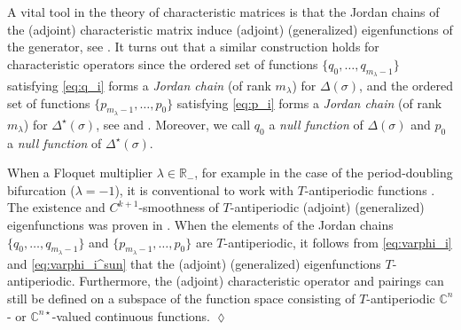\documentclass[english]{myarticle}
\begin{document}
\begin{sloppypar}
A vital tool in the theory of characteristic matrices is that the Jordan chains of the (adjoint) characteristic matrix induce (adjoint) (generalized) eigenfunctions of the generator, see \cite{Kaashoek1992,Diekmann1995,Bosschaert2020,Bosschaert2024a}. It turns out that a similar construction holds for characteristic operators since the ordered set of functions $\{q_0,\dots,q_{m_\lambda - 1} \}$ satisfying \eqref{eq:q_i} forms a \emph{Jordan chain} (of rank $m_\lambda$) for $\Delta(\sigma)$, and the ordered set of functions $\{p_{m_\lambda - 1},\dots,p_0 \}$ satisfying \eqref{eq:p_i} forms a \emph{Jordan chain} (of rank $m_\lambda$) for $\Delta^\star(\sigma)$, see \cite[Section IV.4]{Diekmann1995} and \cite[Section I.1.2]{Kaashoek1992}. Moreover, we call $q_0$ a \emph{null function} of $\Delta(\sigma)$ and $p_0$ a \emph{null function} of $\Delta^\star(\sigma)$.

\begin{remark} \label{remark:Tantiperiodic}
When a Floquet multiplier $\lambda \in \mathbb{R}_{-}$, for example in the case of the period-doubling bifurcation ($\lambda = -1$), it is conventional to work with $T$-antiperiodic functions \cite{Iooss1999,Kuznetsov2005,Article1}. The existence and $C^{k+1}$-smoothness of $T$-antiperiodic (adjoint) (generalized) eigenfunctions was proven in \cite[Proposition 10 and 16]{Article1}. When the elements of the Jordan chains $\{q_0,\dots,q_{m_\lambda - 1} \}$ and $\{p_{m_\lambda - 1},\dots,p_0\}$ are $T$-antiperiodic, it follows from \eqref{eq:varphi_i} and \eqref{eq:varphi_i^sun} that the (adjoint) (generalized) eigenfunctions $T$-antiperiodic. Furthermore, the (adjoint) characteristic operator and pairings can still be defined on a subspace of the function space consisting of $T$-antiperiodic $\mathbb{C}^{n}$- or $\mathbb{C}^{n \star}$-valued continuous functions. \hfill $\lozenge$
\end{remark}


\end{sloppypar}
\end{document}
